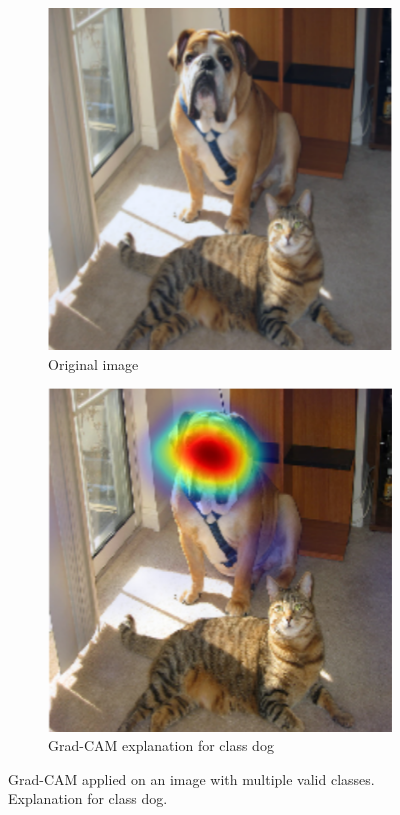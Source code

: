 \begin{figure}[H]
    \centering
    \begin{subfigure}{.5\textwidth}
        \centering
        \includegraphics[width=0.7\linewidth]{chapters/02_methods/images/grad-cam-original.png}
        \caption{Original image}
    \end{subfigure}\hfill%
    \begin{subfigure}{.5\textwidth}
        \centering
        \includegraphics[width=0.7\linewidth]{chapters/02_methods/images/grad-cam-dog.png}
        \caption{Grad-CAM explanation for class dog}
    \end{subfigure}
    \caption{Grad-CAM applied on an image with multiple valid classes. Explanation for class dog.}
    \label{grad_cam_dog}
\end{figure}

